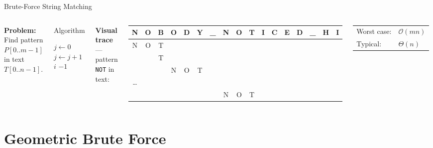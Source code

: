 \documentclass[aspectratio=169]{beamer}
\begin{document}
\begin{frame}[shrink=12]{Brute-Force String Matching}
  \begin{columns}[T]
      \textbf{Problem:} Find pattern $P[0..m{-}1]$ in text $T[0..n{-}1]$.
      \vspace{0.3em}
      \begin{block}{Algorithm}
        \begin{algorithmic}[1]
            \State $j \gets 0$
              \State $j \gets j+1$
            \EndWhile
             \Return $i$ \EndIf
          \EndFor
          \State \Return $-1$
        \end{algorithmic}
      \end{block}
      \textbf{Visual trace} — pattern \texttt{NOT} in text:
      \vspace{0.2em}
      \begin{center}
        \ttfamily\small
        \begin{tabular}{*{17}{c}}
          N&O&B&O&D&Y&\_&N&O&T&I&C&E&D&\_&H&I\\
          \hline
          \rowcolor{PrimaryLight!50} N&O&T & & & & & & & & & & & & & & \\
          & &\cellcolor{AlertRed!30}T & & & & & & & & & & & & & & \\
          & & &N&O&T & & & & & & & & & & & \\
          \ldots & & & & & & & & & & & & & & & & \\
          & & & & & & &\cellcolor{SuccessGreen!30}N&\cellcolor{SuccessGreen!30}O&\cellcolor{SuccessGreen!30}T & & & & & & & \\
        \end{tabular}
      \end{center}
      \vspace{0.3em}
      \begin{tabular}{ll}
        Worst case: & $\mathcal{O}(mn)$ \\
        Typical:    & $\Theta(n)$ \\
      \end{tabular}
  \end{columns}
\end{frame}

\section{Geometric Brute Force}
\end{document}

